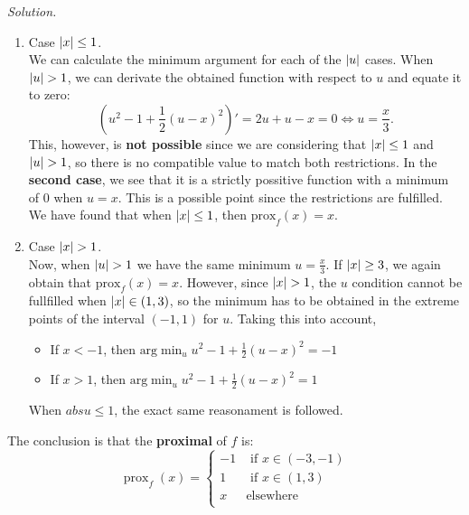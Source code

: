 \documentclass[a4paper]{article}
\DeclarePairedDelimiter\abs{\lvert}{\rvert}%
\newenvironment{solution}
    {\textit{Solution.}\\}
    {}
\begin{document}
\begin{solution}
  \begin{enumerate}
    \item Case \(\abs{x} \leq 1 \).\\

          We can calculate the minimum argument for each of the \(\abs{u}\) cases. When \(\abs{u} > 1\), we can derivate the obtained function with respect to \(u\) and equate it to zero:
          \[
            \left(u^2 - 1 + \frac{1}{2}(u-x)^2\right)' = 2u + u -x = 0 \Longleftrightarrow  u = \frac{x}{3}.
          \]
          This, however, is \textbf{not possible} since we are considering that \(\abs{x} \leq 1\) and \(\abs{u}>1\), so there is no compatible value to match both restrictions. In the \textbf{second case}, we see that it is a strictly possitive function with a minimum of \(0\) when \(u = x\). This is a possible point since the restrictions are fulfilled.\\

          We have found that when \(\abs{x} \leq 1\), then \(\text{prox}_f(x) = x\).

    \item Case \(\abs{x} > 1 \).\\

          Now, when \(\abs{u} > 1\) we have the same minimum \(u = \frac{x}{3}\). If \(\abs{x} \geq 3\), we again obtain that \(\text{prox}_f(x) = x\). However, since \(\abs{x} > 1\), the \(u\) condition cannot be fullfilled when \(\abs{x} \in (1,3)\), so the minimum has to be obtained in the extreme points of the interval \((-1,1)\) for \(u\). Taking this into account,
          \begin{itemize}
            \item If \(x < -1\), then \(\text{arg}\min_u u^2 - 1 + \frac{1}{2}(u-x)^2 = -1\)
            \item If \(x > 1\), then \(\text{arg}\min_u u^2 - 1 + \frac{1}{2}(u-x)^2 = 1\)
          \end{itemize}
          When \(abs{u} \leq 1\), the exact same reasonament is followed.
  \end{enumerate}


  The conclusion is that the \textbf{proximal} of \(f\) is:
  \[
    \operatorname{prox}_f(x) = \begin{cases}
      -1 & \text{ if } x \in (-3,-1) \\
      1  & \text{ if } x \in (1,3)   \\
      x  & \text{elsewhere}          \\
    \end{cases}
  \]
\end{solution}
\end{document}
